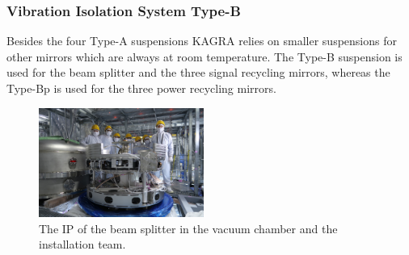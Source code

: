\vspace{10pt}
\subsubsection*{\bf Vibration Isolation System Type-B}
\vspace{3pt}

\vspace{3pt}

\vspace{3pt}


Besides the four Type-A suspensions KAGRA relies on smaller suspensions
for other mirrors which are always at room temperature. The Type-B
suspension is used for the beam splitter and the three signal recycling
mirrors, whereas the Type-Bp is used for the three power recycling
mirrors.

\begin{figure}[h]
\begin{centering}
\includegraphics[width=0.48\textwidth, bb=0 0 1280 853]{astrodiv/gw/vis-b/typeB_team_01.jpg}
\par\end{centering}

\caption{The IP of the beam splitter in the vacuum chamber and the installation
team.}
\end{figure}


